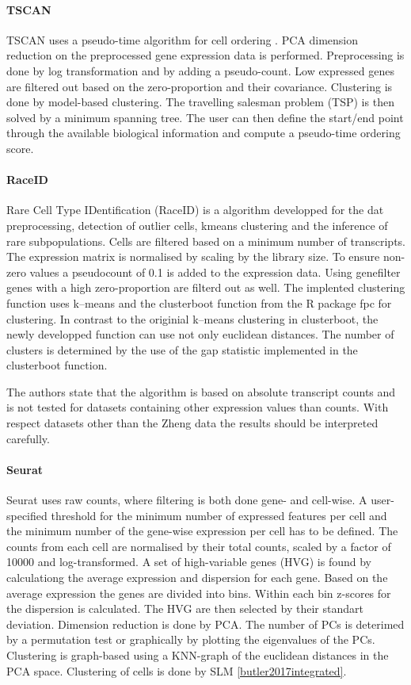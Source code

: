 \documentclass[11pt, a4paper]{article}\usepackage[]{graphicx}\usepackage[]{color}
\begin{document}
\paragraph{TSCAN}
TSCAN uses a pseudo-time algorithm for cell ordering \citep{ji2015tscan}. PCA dimension reduction on the preprocessed gene expression data is performed. Preprocessing is done by log transformation and by adding a pseudo-count. Low expressed genes are filtered out based on the zero-proportion and their covariance. Clustering is done by model-based clustering. 
The travelling salesman problem (TSP) is then solved by a minimum spanning tree. The user can then define the start/end point through the available biological information and compute a pseudo-time ordering score. 
\paragraph{RaceID}
Rare Cell Type IDentification (RaceID) is a algorithm developped for the dat preprocessing, detection of outlier cells, kmeans clustering and the inference of rare subpopulations. Cells are filtered based on a minimum number of transcripts. The expression matrix is normalised by scaling by the library size. To ensure non-zero values a pseudocount of 0.1 is added to the expression data.
Using genefilter genes with a high zero-proportion are filterd out as well.
The implented clustering function uses k--means and the clusterboot function from the R package fpc for clustering. In contrast to the originial k--means clustering in clusterboot, the newly developped function can use not only euclidean distances. 
The number of clusters is determined by the use of the gap statistic implemented in the clusterboot function.

The authors state that the algorithm is based on absolute transcript counts and is not tested for datasets containing other expression values than counts. With respect datasets other than the Zheng data the results should be interpreted carefully.

\paragraph{Seurat}
Seurat uses raw counts, where filtering is both done gene- and cell-wise. A user-specified threshold for the minimum number of expressed features per cell and the minimum number of the  gene-wise expression per cell has to be defined. The counts from each cell are normalised by their total counts, scaled by a factor of 10000 and log-transformed. A set of high-variable genes (HVG) is found by calculationg the average expression and dispersion for each gene. Based on the average expression the genes are divided into bins. Within each bin z-scores for the dispersion is calculated. The HVG are then selected by their standart deviation.
Dimension reduction is done by PCA. The number of PCs is deterimed by a permutation test or graphically by plotting the eigenvalues of the PCs. Clustering is graph-based using a KNN-graph of the euclidean distances in the PCA space. Clustering of cells is done by SLM \ref{butler2017integrated}.
\end{document}
